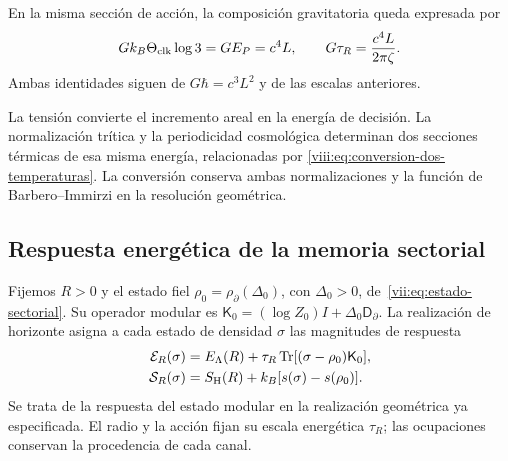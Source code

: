 En la misma sección de acción, la composición gravitatoria queda
expresada por
\begin{equation}
 Gk_B\Theta_{\rm clk}\log3=GE_P=c^4L,
 \qquad G\tau_R=\frac{c^4L}{2\pi\zeta}.
 \label{viii:eq:composicion-termica-gravitatoria}
\end{equation}
Ambas identidades siguen de \(G\hbar=c^3L^2\) y de las escalas
anteriores.

La tensión convierte el incremento areal en la energía de decisión.
La normalización trítica y la periodicidad cosmológica determinan dos
secciones térmicas de esa misma energía, relacionadas por
\eqref{viii:eq:conversion-dos-temperaturas}. La conversión conserva
ambas normalizaciones y la función de Barbero--Immirzi en la resolución
geométrica.

\subsection{Respuesta energética de la memoria sectorial}
\label{viii:subsec:respuesta-energetica-sectorial}

Fijemos \(R>0\) y el estado fiel
\(\rho_0=\rho_\partial(\Delta_0)\), con \(\Delta_0>0\),
de~\eqref{vii:eq:estado-sectorial}. Su operador modular es
\(\mathsf K_0=(\log Z_0)I+\Delta_0\mathsf D_\partial\).
La realización de horizonte asigna a cada estado de densidad
\(\sigma\) las magnitudes de respuesta
\begin{equation}
\begin{aligned}
 \mathcal E_R(\sigma)
 &=E_\Lambda(R)+\tau_R
   \operatorname{Tr}[(\sigma-\rho_0)\mathsf K_0],\\
 \mathcal S_R(\sigma)
 &=S_{\rm H}(R)+k_B[s(\sigma)-s(\rho_0)].
\end{aligned}
 \label{viii:eq:respuesta-horizonte-definida}
\end{equation}
Se trata de la respuesta del estado modular en la realización geométrica
ya especificada. El radio y la acción fijan su escala energética
\(\tau_R\); las ocupaciones conservan la procedencia de cada canal.


